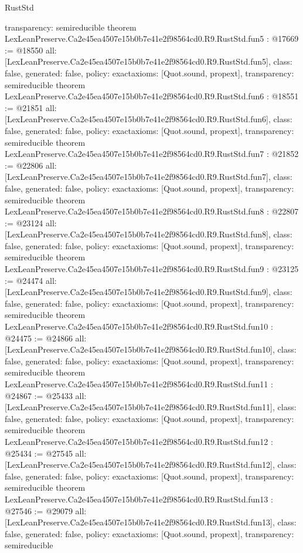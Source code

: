 \begin{lexlean}{RustStd}
\begin{coremodule}
{  transparency: semireducible
}
theorem LexLeanPreserve.Ca2e45ea4507e15b0b7e41e2f98564cd0.R9.RustStd.fun5 : @17669 := @18550 {
  all: [LexLeanPreserve.Ca2e45ea4507e15b0b7e41e2f98564cd0.R9.RustStd.fun5],
  class: false,
  generated: false,
  policy: exact{axioms: [Quot.sound, propext]},
  transparency: semireducible
}
theorem LexLeanPreserve.Ca2e45ea4507e15b0b7e41e2f98564cd0.R9.RustStd.fun6 : @18551 := @21851 {
  all: [LexLeanPreserve.Ca2e45ea4507e15b0b7e41e2f98564cd0.R9.RustStd.fun6],
  class: false,
  generated: false,
  policy: exact{axioms: [Quot.sound, propext]},
  transparency: semireducible
}
theorem LexLeanPreserve.Ca2e45ea4507e15b0b7e41e2f98564cd0.R9.RustStd.fun7 : @21852 := @22806 {
  all: [LexLeanPreserve.Ca2e45ea4507e15b0b7e41e2f98564cd0.R9.RustStd.fun7],
  class: false,
  generated: false,
  policy: exact{axioms: [Quot.sound, propext]},
  transparency: semireducible
}
theorem LexLeanPreserve.Ca2e45ea4507e15b0b7e41e2f98564cd0.R9.RustStd.fun8 : @22807 := @23124 {
  all: [LexLeanPreserve.Ca2e45ea4507e15b0b7e41e2f98564cd0.R9.RustStd.fun8],
  class: false,
  generated: false,
  policy: exact{axioms: [Quot.sound, propext]},
  transparency: semireducible
}
theorem LexLeanPreserve.Ca2e45ea4507e15b0b7e41e2f98564cd0.R9.RustStd.fun9 : @23125 := @24474 {
  all: [LexLeanPreserve.Ca2e45ea4507e15b0b7e41e2f98564cd0.R9.RustStd.fun9],
  class: false,
  generated: false,
  policy: exact{axioms: [Quot.sound, propext]},
  transparency: semireducible
}
theorem LexLeanPreserve.Ca2e45ea4507e15b0b7e41e2f98564cd0.R9.RustStd.fun10 : @24475 := @24866 {
  all: [LexLeanPreserve.Ca2e45ea4507e15b0b7e41e2f98564cd0.R9.RustStd.fun10],
  class: false,
  generated: false,
  policy: exact{axioms: [Quot.sound, propext]},
  transparency: semireducible
}
theorem LexLeanPreserve.Ca2e45ea4507e15b0b7e41e2f98564cd0.R9.RustStd.fun11 : @24867 := @25433 {
  all: [LexLeanPreserve.Ca2e45ea4507e15b0b7e41e2f98564cd0.R9.RustStd.fun11],
  class: false,
  generated: false,
  policy: exact{axioms: [Quot.sound, propext]},
  transparency: semireducible
}
theorem LexLeanPreserve.Ca2e45ea4507e15b0b7e41e2f98564cd0.R9.RustStd.fun12 : @25434 := @27545 {
  all: [LexLeanPreserve.Ca2e45ea4507e15b0b7e41e2f98564cd0.R9.RustStd.fun12],
  class: false,
  generated: false,
  policy: exact{axioms: [Quot.sound, propext]},
  transparency: semireducible
}
theorem LexLeanPreserve.Ca2e45ea4507e15b0b7e41e2f98564cd0.R9.RustStd.fun13 : @27546 := @29079 {
  all: [LexLeanPreserve.Ca2e45ea4507e15b0b7e41e2f98564cd0.R9.RustStd.fun13],
  class: false,
  generated: false,
  policy: exact{axioms: [Quot.sound, propext]},
  transparency: semireducible
}
\end{coremodule}
\end{lexlean}

